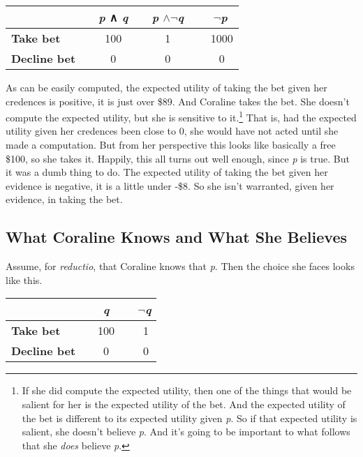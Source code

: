 \documentclass[
  10pt,
  letterpaper,
  DIV=11,
  numbers=noendperiod,
  twoside]{scrartcl}
\begin{document}
\begin{longtable}[]{@{}lccc@{}}
\toprule\noalign{}
~ & ~\emph{p} ∧ \emph{q}~ & ~\emph{p} \(\wedge \neg\)\emph{q}~ &
~\(\neg\)\emph{p} \\
\midrule\noalign{}
\endhead
\bottomrule\noalign{}
\endlastfoot
\textbf{Take bet} ~ & ~ 100 ~ & ~ 1 ~ & ~ 1000 \\
\textbf{Decline bet}~ & ~ 0 ~ & ~ 0 ~ & ~ 0 \\
\end{longtable}

As can be easily computed, the expected utility of taking the bet given
her credences is positive, it is just over \$89. And Coraline takes the
bet. She doesn't compute the expected utility, but she is sensitive to
it.\footnote{If she did compute the expected utility, then one of the
  things that would be salient for her is the expected utility of the
  bet. And the expected utility of the bet is different to its expected
  utility given \emph{p}. So if that expected utility is salient, she
  doesn't believe \emph{p}. And it's going to be important to what
  follows that she \emph{does} believe \emph{p}.} That is, had the
expected utility given her credences been close to 0, she would have not
acted until she made a computation. But from her perspective this looks
like basically a free \$100, so she takes it. Happily, this all turns
out well enough, since \emph{p} is true. But it was a dumb thing to do.
The expected utility of taking the bet given her evidence is negative,
it is a little under -\$8. So she isn't warranted, given her evidence,
in taking the bet.

\subsection{What Coraline Knows and What She
Believes}\label{what-coraline-knows-and-what-she-believes}

Assume, for \emph{reductio}, that Coraline knows that \emph{p}. Then the
choice she faces looks like this.

\begin{longtable}[]{@{}lcc@{}}
\toprule\noalign{}
~ & ~\emph{q}~ & ~\(\neg\)\emph{q} \\
\midrule\noalign{}
\endhead
\bottomrule\noalign{}
\endlastfoot
\textbf{Take bet} ~ & ~100~ & ~ 1 \\
\textbf{Decline bet}~ & ~ 0 ~ & ~ 0 \\
\end{longtable}
\end{document}
